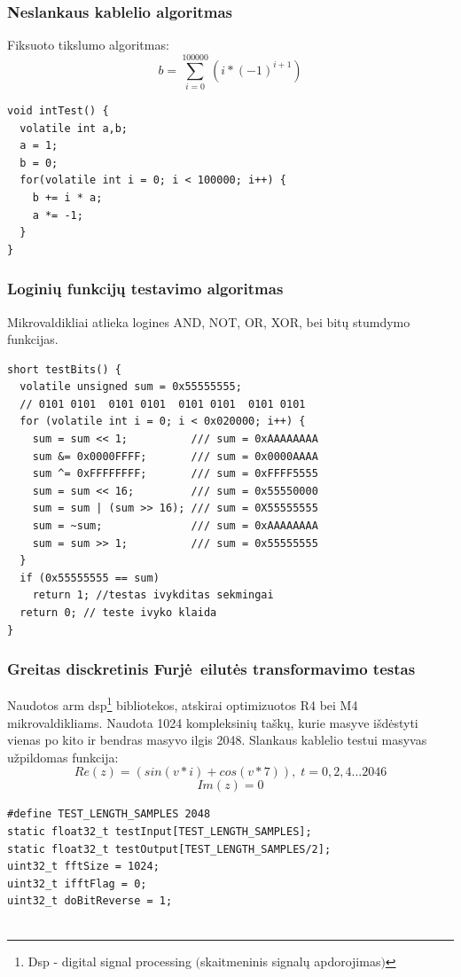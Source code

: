 \documentclass[a4paper, 12pt]{article} %
\begin{document}
\begin{onehalfspacing}
\subsubsection{Neslankaus kablelio algoritmas}
Fiksuoto tikslumo algoritmas:
\begin{equation}
b = \sum_{i=0}^{100000} (i * (-1)^{i+1})
\end{equation}

\begin{verbatim}
void intTest() {
  volatile int a,b;
  a = 1;
  b = 0;
  for(volatile int i = 0; i < 100000; i++) {
    b += i * a;
    a *= -1;
  }
}
\end{verbatim}
\subsubsection{Logini\k{u} funkcij\k{u} testavimo algoritmas}
Mikrovaldikliai atlieka logines AND, NOT, OR, XOR, bei bit\k{u} stumdymo funkcijas. 
\begin{verbatim}
short testBits() {
  volatile unsigned sum = 0x55555555; 
  // 0101 0101  0101 0101  0101 0101  0101 0101  
  for (volatile int i = 0; i < 0x020000; i++) {
    sum = sum << 1;          /// sum = 0xAAAAAAAA 
    sum &= 0x0000FFFF;       /// sum = 0x0000AAAA
    sum ^= 0xFFFFFFFF;       /// sum = 0xFFFF5555
    sum = sum << 16;         /// sum = 0x55550000
    sum = sum | (sum >> 16); /// sum = 0X55555555
    sum = ~sum;              /// sum = 0xAAAAAAAA
    sum = sum >> 1;          /// sum = 0x55555555
  }
  if (0x55555555 == sum)
    return 1; //testas ivykditas sekmingai
  return 0; // teste ivyko klaida
}
\end{verbatim}
\subsubsection{Greitas disckretinis Furj\.e\ eilut\.es transformavimo testas}
Naudotos arm dsp\footnote{Dsp - digital signal processing $($skaitmeninis signal\k{u} apdorojimas$)$} bibliotekos, atskirai optimizuotos R4 bei M4 mikrovaldikliams. Naudota 1024 kompleksini\k{u} ta\v{s}k\k{u}, kurie masyve i\v{s}d\.estyti vienas po kito ir bendras masyvo ilgis 2048. Slankaus kablelio testui masyvas u\v{z}pildomas funkcija:
\begin{equation*}
Re(z) = (sin(v*i) + cos(v*7)),\; t = 0, 2, 4... 2046
\end{equation*}
\begin{equation}
Im(z) = 0
\end{equation}
\begin{verbatim}
#define TEST_LENGTH_SAMPLES 2048 
static float32_t testInput[TEST_LENGTH_SAMPLES]; 
static float32_t testOutput[TEST_LENGTH_SAMPLES/2]; 
uint32_t fftSize = 1024; 
uint32_t ifftFlag = 0; 
uint32_t doBitReverse = 1; 


\end{verbatim}
\end{onehalfspacing}
\end{document}

